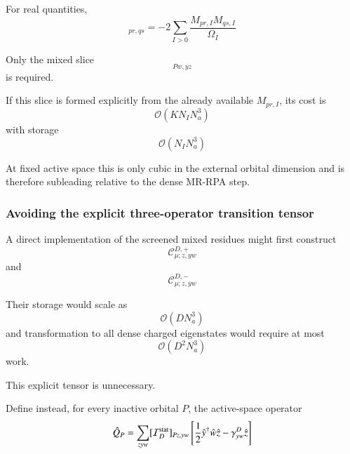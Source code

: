 \documentclass[aip,jcp,reprint,noshowkeys,superscriptaddress]{revtex4-1}
\begin{document}
For real quantities,
\begin{equation}
  [w_D^c(0)]_{pr,qs}
  =
  -2
  \sum_{I>0}
  \frac{
    M_{pr,I}M_{qs,I}
  }{
    \Omega_I
  }
  \label{eq:wc-zero-real}
\end{equation}

Only the mixed slice
\begin{equation}
  [W_D^0]_{Pw,yz}
\end{equation}
is required.

If this slice is formed explicitly from the already available
$M_{pr,I}$, its cost is
\begin{equation}
  \mathcal O
  \left(
    K N_I N_a^3
  \right)
  \label{eq:Wmixed-cost}
\end{equation}
with storage
\begin{equation}
  \mathcal O
  \left(
    N_I N_a^3
  \right)
  \label{eq:Wmixed-memory}
\end{equation}

At fixed active space this is only cubic in the external orbital
dimension and is therefore subleading relative to the dense MR-RPA
step.


\subsubsection{Avoiding the explicit three-operator transition tensor}

A direct implementation of the screened mixed residues might first
construct
\begin{equation}
  \mathcal C_{\mu;z,yw}^{D,+}
\end{equation}
and
\begin{equation}
  \mathcal C_{\mu;z,yw}^{D,-}
\end{equation}

Their storage would scale as
\begin{equation}
  \mathcal O(DN_a^3)
\end{equation}
and transformation to all dense charged eigenstates would require at
most
\begin{equation}
  \mathcal O(D^2N_a^3)
\end{equation}
work.

This explicit tensor is unnecessary.

Define instead, for every inactive orbital $P$, the active-space
operator
\begin{equation}
  \hat Q_P
  =
  \sum_{zyw}
  [\mathcal I_D^{\rm stat}]_{Pz,yw}
  \left[
    \frac12
    \hat y^\dagger\hat w\hat z
    -
    \gamma_{yw}^D
    \hat z
  \right]
  \label{eq:QP-operator}
\end{equation}
\end{document}
